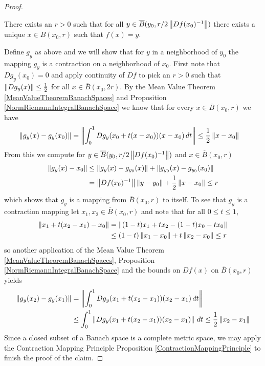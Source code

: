 \begin{proof}
\begin{clm}There exists an $r > 0$ such that for all $y \in \overline{B}(y_0, r/2 \left \lVert Df(x_0)^{-1} \right \rVert)$ there exists a unique $x \in \overline{B}(x_0, r)$ such that $f(x) = y$.
\end{clm}
Define $g_y$ as above and we will show that for $y$ in a neighborhood of $y_0$ the mapping $g_y$ is a contraction on a neighborhood of $x_0$.  First note that $D g_y(x_0) = 0$ and apply continuity of $Df$ to pick an $r > 0$ such that $\left \lVert D g_y (x) \right \rVert \leq \frac{1}{2}$ for all $x \in \overline{B}(x_0,2r)$.  By the Mean Value Theorem \ref{MeanValueTheoremBanachSpaces} and Proposition \ref{NormRiemannIntegralBanachSpace} we know that for every $x \in \overline{B}(x_0, r)$ we have 
\begin{align*}
\left \lVert g_y(x) - g_y(x_0) \right \rVert &= \left \lVert \int_0^1 Dg_y(x_0 + t(x-x_0)) (x - x_0) \, dt \right \rVert \leq \frac{1}{2} \left \lVert x - x_0 \right \rVert
\end{align*}
From this we compute for $y \in \overline{B}(y_0, r/2 \left \lVert Df(x_0)^{-1} \right \rVert)$ and $x \in \overline{B}(x_0, r)$
\begin{align*}
\left \lVert g_y(x) - x_0 \right \rVert &\leq \left \lVert g_y(x) - g_{y_0}(x) \right \rVert + \left \lVert g_{y_0}(x) - g_{y_0}(x_0) \right \rVert \\
&= \left \lVert Df(x_0)^{-1} \right \rVert \left \lVert y - y_0 \right \rVert + \frac{1}{2} \left \lVert x - x_0 \right \rVert \leq r
\end{align*}
which shows that $g_y$ is a mapping from $\overline{B}(x_0, r)$ to itself.  To see that $g_y$ is a contraction mapping let $x_1, x_2 \in \overline{B}(x_0, r)$ and note that for all $0 \leq t \leq 1$, 
\begin{align*}
\left \lVert x_1 + t (x_2 - x_1) - x_0 \right \rVert &= \left \lVert (1-t) x_1 + t x_2 - (1-t) x_0 - t x_0 \right \rVert  \\
&\leq (1-t) \left \lVert x_1-x_0 \right \rVert + t \left \lVert x_2 - x_0 \right \rVert \leq r
\end{align*} 
so another application of the Mean Value Theorem \ref{MeanValueTheoremBanachSpaces}, Proposition \ref{NormRiemannIntegralBanachSpace} and the bounds on $Df(x)$ on $\overline{B}(x_0, r)$ yields
\begin{align*}
\left \lVert g_y(x_2) - g_y(x_1) \right \rVert &= \left \lVert \int_0^1 Dg_y(x_1 + t(x_2 - x_1)) (x_2 - x_1) \, dt \right \rVert \\
&\leq \int_0^1 \left \lVert  Dg_y(x_1 + t(x_2 - x_1)) (x_2 - x_1) \right \rVert \, dt 
\leq \frac{1}{2} \left \lVert x_2 - x_1 \right \rVert
\end{align*}
Since a closed subset of a Banach space is a complete metric space, we may apply the Contraction Mapping Principle Proposition \ref{ContractionMappingPrinciple} to finish the proof of the claim.


\end{proof}
